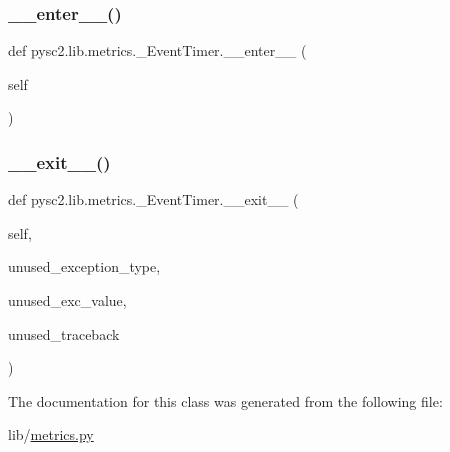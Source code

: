 \subsubsection{\texorpdfstring{\+\_\+\+\_\+enter\+\_\+\+\_\+()}{\_\_enter\_\_()}}
{\footnotesize\ttfamily def pysc2.\+lib.\+metrics.\+\_\+\+Event\+Timer.\+\_\+\+\_\+enter\+\_\+\+\_\+ (\begin{DoxyParamCaption}\item[{}]{self }\end{DoxyParamCaption})}

\mbox{\label{classpysc2_1_1lib_1_1metrics_1_1___event_timer_a41da3f624cce120628f8f6a2d1ec3a2c}} 
\subsubsection{\texorpdfstring{\+\_\+\+\_\+exit\+\_\+\+\_\+()}{\_\_exit\_\_()}}
{\footnotesize\ttfamily def pysc2.\+lib.\+metrics.\+\_\+\+Event\+Timer.\+\_\+\+\_\+exit\+\_\+\+\_\+ (\begin{DoxyParamCaption}\item[{}]{self,  }\item[{}]{unused\+\_\+exception\+\_\+type,  }\item[{}]{unused\+\_\+exc\+\_\+value,  }\item[{}]{unused\+\_\+traceback }\end{DoxyParamCaption})}



The documentation for this class was generated from the following file\+:\begin{DoxyCompactItemize}
\item 
lib/\mbox{\hyperlink{metrics_8py}{metrics.\+py}}\end{DoxyCompactItemize}

